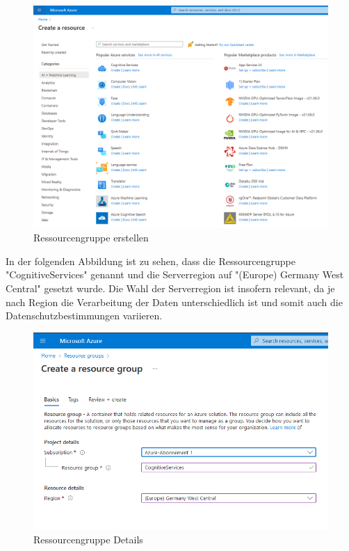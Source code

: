 \begin{figure}[h]
    \centering
    \includegraphics[scale=0.4]{sections/cloud-computing/images/ressourcengruppe.png}
    \caption{Ressourcengruppe erstellen}
    \label{fig:kimldl-comparison}
\end{figure}

\newpage In der folgenden Abbildung ist zu sehen, dass die Ressourcengruppe "CognitiveServices" genannt und die Serverregion auf
"(Europe) Germany West Central" gesetzt wurde. Die Wahl der Serverregion ist insofern relevant, da je nach Region die Verarbeitung der
Daten unterschiedlich ist und somit auch die Datenschutzbestimmungen variieren.

\begin{figure}[h]
    \centering
    \includegraphics[scale=0.6]{sections/cloud-computing/images/ressourcengruppe-erstellen.png}
    \caption{Ressourcengruppe Details}
    \label{fig:formrecognizer-ressourcegroup}
\end{figure}

